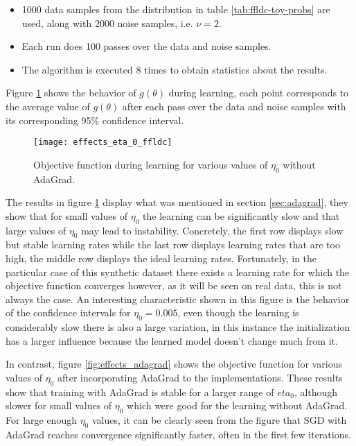 \begin{itemize}
  \item 1000 data samples from the distribution in table \ref{tab:ffldc-toy-probs} are used, along with 2000 noise samples, i.e. $\nu = 2$.
  \item Each run does 100 passes over the data and noise samples.
  \item The algorithm is executed 8 times to obtain statistics about the results.
\end{itemize}

Figure \ref{fig:effects_eta_0} shows the behavior of $g(\theta)$ during learning, each point corresponds to the average value of $g(\theta)$ after each pass over the data and noise samples with its corresponding 95\% confidence interval.

\begin{figure}
  \centering
  \texttt{[image: effects\_eta\_0\_ffldc]}
  \caption{Objective function during learning for various values of $\eta_0$ without AdaGrad.}
  \label{fig:effects_eta_0}
\end{figure}

The results in figure \ref{fig:effects_eta_0} display what was mentioned in section \ref{sec:adagrad}, they show that for small values of $\eta_0$ the learning can be significantly slow and that large values of $\eta_0$ may lead to instability. Concretely,  the first row displays slow but stable learning rates while the last row displays learning rates that are too high, the middle row displays the ideal learning rates. Fortunately, in the particular case of this synthetic dataset there exists a learning rate for which the objective function converges however, as it will be seen on real data, this is not always the case. An interesting characteristic shown in this figure is the behavior of the confidence intervals for $\eta_0 = 0.005$, even though the learning is considerably slow there is also a large variation, in this instance the initialization has a larger influence because the learned model doesn't change much from it.

In contrast, figure \ref{fig:effects_adagrad} shows the objective function for various values of $\eta_{0}$ after incorporating AdaGrad to the implementations. These results show that training with AdaGrad is stable for a larger range of $eta_0$, although slower for small values of $\eta_{0}$ which were good for the learning without AdaGrad. For large enough $\eta_0$ values, it can be clearly seen from the figure that SGD with AdaGrad reaches convergence significantly faster, often in the first few iterations.


